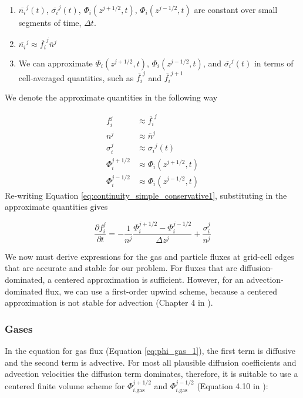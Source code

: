 \documentclass{article}
\begin{document}
\begin{enumerate}
  \item $\overline{n_i}^j(t)$, $\overline{\sigma_i}^j(t)$, $\Phi_{i}(z^{j+1/2},t)$, $\Phi_{i}(z^{j-1/2},t)$  are constant over small segments of time, $\Delta t$.
  \item $\overline{n_i}^j \approx \overline{f_i}^j \overline{n}^j$
  \item We can approximate $\Phi_{i}(z^{j+1/2},t)$, $\Phi_{i}(z^{j-1/2},t)$, and $\overline{\sigma_i}^j(t)$ in terms of cell-averaged quantities, such as $\overline{f_i}^j$ and $\overline{f_i}^{j+1}$
\end{enumerate}
We denote the approximate quantities in the following way

\begin{align}
  f_i^{j} &\approx \overline{f_i}^{j} \nonumber \\
  n^{j} &\approx \overline{n}^{j} \nonumber \\
  \sigma_i^j &\approx \overline{\sigma_i}^j(t) \nonumber \\
  \Phi_{i}^{j+1/2} &\approx \Phi_{i}(z^{j+1/2},t) \nonumber \\
  \Phi_{i}^{j-1/2} &\approx \Phi_{i}(z^{j-1/2},t) \nonumber
\end{align}
Re-writing Equation \eqref{eq:continuity_simple_conservative1}, substituting in the approximate quantities gives

\begin{equation} \label{eq:continuity_simple_approx}
  \frac{\partial f_i^j}{\partial t} = - \frac{1}{n^{j}} \frac{\Phi_{i}^{j+1/2} - \Phi_{i}^{j-1/2}}{\Delta z^j} + \frac{\sigma_i^j}{n^{j}}
\end{equation}

We now must derive expressions for the gas and particle fluxes at grid-cell edges that are accurate and stable for our problem. For fluxes that are diffusion-dominated, a centered approximation is sufficient. However, for an advection-dominated flux, we can use a first-order upwind scheme, because a centered approximation is not stable for advection (Chapter 4 in \cite{Leveque_2002}).

\subsubsection{Gases}

In the equation for gas flux (Equation \eqref{eq:phi_gas_1}), the first term is diffusive and the second term is advective. For most all plausible diffusion coefficients and advection velocities the diffusion term dominates, therefore, it is suitable to use a centered finite volume scheme for $\Phi_{i\text{,gas}}^{j+1/2}$ and $\Phi_{i\text{,gas}}^{j-1/2}$ (Equation 4.10 in \cite{Leveque_2002}):
\end{document}
